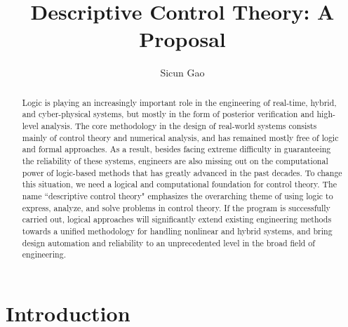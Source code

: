 \documentclass[11pt]{article}
\title{\bf Descriptive Control Theory: A Proposal}
\author{Sicun Gao}
\date{}
\theoremstyle{definition}
\begin{document}
\maketitle
\thispagestyle{empty}
\begin{abstract}
Logic is playing an increasingly important role in the engineering of real-time, hybrid, and cyber-physical systems, but mostly in the form of posterior verification and high-level analysis. The core methodology in the design of real-world systems consists mainly of control theory and numerical analysis, and has remained mostly free of logic and formal approaches. As a result, besides facing extreme difficulty in guaranteeing the reliability of these systems, engineers are also missing out on the computational power of logic-based methods that has greatly advanced in the past decades. To change this situation, we need a logical and computational foundation for control theory. The name ``descriptive control theory" emphasizes the overarching theme of using logic to express, analyze, and solve problems in control theory. If the program is successfully carried out, logical approaches will significantly extend existing engineering methods towards a unified methodology for handling nonlinear and hybrid systems, and bring design automation and reliability to an unprecedented level in the broad field of engineering. 
\end{abstract}

\vspace{.6cm}

\section{Introduction}
\end{document}
